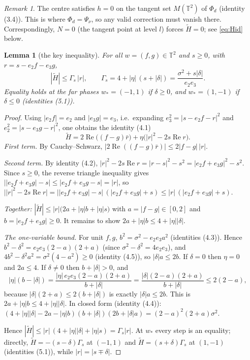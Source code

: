 \documentclass[11pt]{article}
\newtheorem{lemma}{Lemma}
\theoremstyle{remark}
\newtheorem{remark}{Remark}
\renewcommand{\Re}{\operatorname{Re}}
\newcommand{\T}{\mathbb{T}}
\begin{document}
\begin{remark}
The centre satisfies $h=0$ on the tangent set $M(\T^2)$ of $\Phi_d$ (identity (3.4)). This is where $\Phi_d=\Psi_\nu$, so any valid
correction must vanish there. Correspondingly, $N=0$ (the tangent point at level $l$) forces $\widetilde H=0$; see
\eqref{eq:Hid} below.
\end{remark}

\begin{lemma}[the key inequality]\label{lem:key}
For all $w=(f,g)\in\T^2$ and $s\ge0$, with $r=s-e_2f-e_3g$,
\[
|\widetilde H|\le\Gamma_s\,|r|,\qquad \Gamma_s=4+|\eta|\,(s+|\delta|)=\frac{\sigma^2+s|\delta|}{e_2e_3}.
\]
Equality holds at the \emph{far phases} $w_*=(-1,1)$ if $\delta\ge0$, and $w_*=(1,-1)$ if $\delta\le0$ (identities (5.1)).
\end{lemma}
\begin{proof}
Using $|e_2f|=e_2$ and $|e_3g|=e_3$, i.e.\ expanding $e_3^2=|s-e_2f-r|^2$ and $e_2^2=|s-e_3g-r|^2$, one obtains the identity
(4.1)
\begin{equation}\label{eq:Hid}
\widetilde H=2\Re\bigl((f-g)\bar r\bigr)+\eta\bigl(|r|^2-2s\Re r\bigr).
\end{equation}
\emph{First term.} By Cauchy--Schwarz, $|2\Re((f-g)\bar r)|\le2|f-g|\,|r|$.

\emph{Second term.} By identity (4.2), $|r|^2-2s\Re r=|r-s|^2-s^2=|e_2f+e_3g|^2-s^2$. Since $s\ge0$, the reverse triangle
inequality gives $\bigl||e_2f+e_3g|-s\bigr|\le|e_2f+e_3g-s|=|r|$, so
$\bigl||r|^2-2s\Re r\bigr|=\bigl||e_2f+e_3g|-s\bigr|\,(|e_2f+e_3g|+s)\le|r|\,(|e_2f+e_3g|+s)$.

\emph{Together:} $|\widetilde H|\le|r|\bigl(2a+|\eta|b+|\eta|s\bigr)$ with $a=|f-g|\in[0,2]$ and $b=|e_2f+e_3g|\ge0$. It remains
to show $2a+|\eta|b\le4+|\eta||\delta|$.

\emph{The one-variable bound.} For unit $f,g$, $b^2=\sigma^2-e_2e_3a^2$ (identities (4.3)). Hence
$b^2-\delta^2=e_2e_3(2-a)(2+a)$ (since $\sigma^2-\delta^2=4e_2e_3$), and
$4b^2-\delta^2a^2=\sigma^2(4-a^2)\ge0$ (identity (4.5)), so $|\delta|a\le2b$. If $\delta=0$ then $\eta=0$ and $2a\le4$. If
$\delta\ne0$ then $b+|\delta|>0$, and
\[
|\eta|(b-|\delta|)=\frac{|\eta|\,e_2e_3(2-a)(2+a)}{b+|\delta|}=\frac{|\delta|(2-a)(2+a)}{b+|\delta|}\le2(2-a),
\]
because $|\delta|(2+a)\le2(b+|\delta|)$ is exactly $|\delta|a\le2b$. This is $2a+|\eta|b\le4+|\eta||\delta|$. In closed form
(identity (4.4)): $(4+|\eta||\delta|-2a-|\eta|b)(b+|\delta|)(2b+|\delta|a)=(2-a)^2(2+a)\sigma^2$.

Hence $|\widetilde H|\le|r|\,(4+|\eta||\delta|+|\eta|s)=\Gamma_s|r|$. At $w_*$ every step is an equality; directly,
$\widetilde H=-(s-\delta)\Gamma_s$ at $(-1,1)$ and $\widetilde H=(s+\delta)\Gamma_s$ at $(1,-1)$ (identities (5.1)), while
$|r|=|s\mp\delta|$.
\end{proof}
\end{document}
